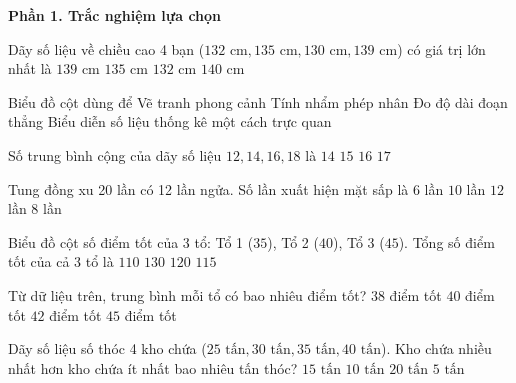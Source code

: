 \textbf{Phần 1. Trắc nghiệm lựa chọn}

\begin{ex} %
Dãy số liệu về chiều cao 4 bạn ($132\text{ cm}, 135\text{ cm}, 130\text{ cm}, 139\text{ cm}$) có giá trị lớn nhất là
\choice
{\True $139\text{ cm}$}
{$135\text{ cm}$}
{$132\text{ cm}$}
{$140\text{ cm}$}
\end{ex}

\begin{ex} %
Biểu đồ cột dùng để
\choice
{Vẽ tranh phong cảnh}
{Tính nhẩm phép nhân}
{Đo độ dài đoạn thẳng}
{\True Biểu diễn số liệu thống kê một cách trực quan}
\end{ex}

\begin{ex} %
Số trung bình cộng của dãy số liệu $12, 14, 16, 18$ là
\choice
{$14$}
{\True $15$}
{$16$}
{$17$}
\end{ex}

\begin{ex} %
Tung đồng xu 20 lần có 12 lần ngửa. Số lần xuất hiện mặt sấp là
\choice
{$6$ lần}
{$10$ lần}
{$12$ lần}
{\True $8$ lần}
\end{ex}

\begin{ex} %
Biểu đồ cột số điểm tốt của 3 tổ: Tổ 1 ($35$), Tổ 2 ($40$), Tổ 3 ($45$). Tổng số điểm tốt của cả 3 tổ là
\choice
{$110$}
{$130$}
{\True $120$}
{$115$}
\end{ex}

\begin{ex} %
Từ dữ liệu trên, trung bình mỗi tổ có bao nhiêu điểm tốt?
\choice
{$38$ điểm tốt}
{\True $40$ điểm tốt}
{$42$ điểm tốt}
{$45$ điểm tốt}
\end{ex}

\begin{ex} %
Dãy số liệu số thóc 4 kho chứa ($25\text{ tấn}, 30\text{ tấn}, 35\text{ tấn}, 40\text{ tấn}$). Kho chứa nhiều nhất hơn kho chứa ít nhất bao nhiêu tấn thóc?
\choice
{\True $15\text{ tấn}$}
{$10\text{ tấn}$}
{$20\text{ tấn}$}
{$5\text{ tấn}$}
\end{ex}

